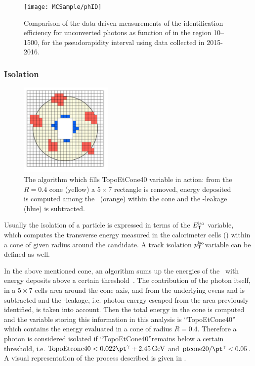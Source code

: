 \begin{figure}[pt]
\centering
\texttt{[image: MCSample/phID]}
\caption{Comparison of the data-driven measurements of the identification efficiency for unconverted photons as function of \et in the region \SIrange{10}{1500}{\gev}, for the pseudorapidity interval  using data collected in 2015-2016.}
\label{fig:phID}
\end{figure}

\subsubsection{Isolation}
\label{sec:phisolation}
\begin{figure}[tp]
\centering
\includegraphics[width=0.4\textwidth]{MCSample/topoetcone40}
\caption{The algorithm which fills TopoEtCone40 variable in action: from the $R=0.4$ cone (yellow) a $5\times7$ rectangle is removed, energy deposited is computed among the \topo~(orange) within the cone and the \pt-leakage (blue) is subtracted.}
\label{topoetcone40}
\end{figure}

Usually the isolation of a particle is expressed in terms of the $E_\textup{T}^{\textup{iso}}$ variable, which computes the transverse energy measured in the calorimeter cells (\topo) within a cone of given radius around the candidate. A track isolation $p_\textup{T}^{\textup{iso}}$variable can be defined as well.

In the above mentioned cone, an algorithm sums up the energies of the \topo~with energy deposits above a certain threshold~\cite{photonsISO}. The contribution of the photon itself, in a $5\times7$ cells area around the cone axis, and from the underlying evens and \pileup is  subtracted and the \pt-leakage, i.e. photon energy escaped from the area previously identified, is taken into account. Then the total energy in the cone is computed and the variable storing this information in this analysis is ``TopoEtCone40'' which contains the energy evaluated in a cone of radius $R=0.4$. Therefore a photon is considered isolated if ``TopoEtCone40''remains below a certain threshold, i.e. $\text{TopoEtcone40} < 0.022\pt^\gamma + \SI{2.45}{\GeV}$ and $\text{ptcone20}/\pt^\gamma<0.05$. A visual representation of the process described is given in \Fig{\ref{topoetcone40}}.

